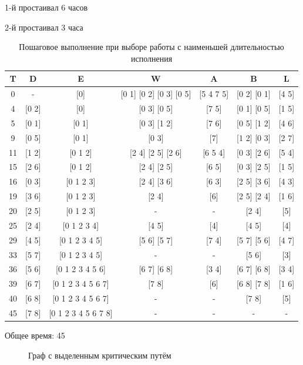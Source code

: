 \documentclass[a4paper,14pt]{extarticle}
\begin{document}
1-й простаивал 6 часов

2-й простаивал 3 часа

\begin{table}[H]
\caption{Пошаговое выполнение при выборе работы с наименьшей длительностью исполнения}
\label{tabular:timesandtenses}
\begin{center}
\begin{tabular}{|c|c|c|c|c|c|c|}
\hline
T & D & E & W & A & B & L\\ \hline
0 & - & [0] & [0 1]
 [0 2]
 [0 3]
 [0 5] & [5 4 7 5] & [0 2]
 [0 1] & [4 5] \\ \hline 
 4 & [0 2] & [0] & [0 3]
 [0 5] & [7 5] & [0 1]
 [0 5] & [1 5] \\ \hline 
 5 & [0 1] & [0 1] & [0 3]
 [1 2] & [7 6] & [0 5]
 [1 2] & [4 6] \\ \hline 
 9 & [0 5] & [0 1] & [0 3] & [7] & [1 2]
 [0 3] & [2 7] \\ \hline 
 11 & [1 2] & [0 1 2] & [2 4]
 [2 5]
 [2 6] & [6 5 4] & [0 3]
 [2 6] & [5 4] \\ \hline 
 15 & [2 6] & [0 1 2] & [2 4]
 [2 5] & [6 5] & [0 3]
 [2 5] & [1 5] \\ \hline 
 16 & [0 3] & [0 1 2 3] & [2 4]
 [3 6] & [6 3] & [2 5]
 [3 6] & [4 3] \\ \hline 
 19 & [3 6] & [0 1 2 3] & [2 4] & [6] & [2 5]
 [2 4] & [1 6] \\ \hline 
 20 & [2 5] & [0 1 2 3] & - & - & [2 4] & [5] \\ \hline 
 25 & [2 4] & [0 1 2 3 4] & [4 5] & [4] & [4 5] & [4] \\ \hline 
 29 & [4 5] & [0 1 2 3 4 5] & [5 6]
 [5 7] & [7 4] & [5 7]
 [5 6] & [4 7] \\ \hline 
 33 & [5 7] & [0 1 2 3 4 5] & - & - & [5 6] & [3] \\ \hline 
 36 & [5 6] & [0 1 2 3 4 5 6] & [6 7]
 [6 8] & [3 4] & [6 7]
 [6 8] & [3 4] \\ \hline 
 39 & [6 7] & [0 1 2 3 4 5 6 7] & [7 8] & [6] & [6 8]
 [7 8] & [1 6] \\ \hline 
 40 & [6 8] & [0 1 2 3 4 5 6 7] & - & - & [7 8] & [5] \\ \hline 
 45 & [7 8] & [0 1 2 3 4 5 6 7 8] & - & - & - & - \\ \hline 
\end{tabular}
\end{center}
\end{table}

Общее время: 45

\begin{figure}[h]
\caption{Граф с выделенным критическим путём}
\label{ris:image}
\end{figure}
\end{document}
